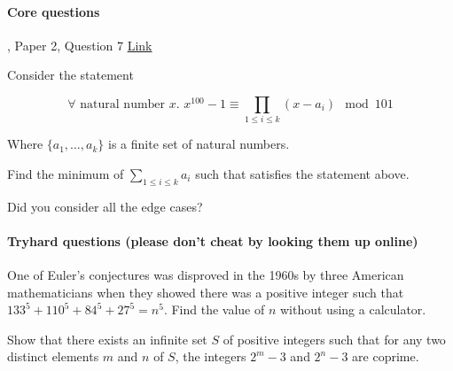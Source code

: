 \documentclass{exam}
\begin{document}
\paragraph{Core questions}
\begin{questions}
, Paper 2, Question 7
\href{http://www.cl.cam.ac.uk/teaching/exams/pastpapers/y2014p2q7.pdf}{Link}

\question Consider the statement

$$\forall \text{ natural number }x \text{. } x^{100} - 1 \equiv \prod_{1 \le i \le k} (x-a_i) \mod 101$$

Where $\{a_1, \ldots , a_k \}$ is a finite set of natural numbers.

Find the minimum of $\sum_{1 \le i \le k} a_i$ such that satisfies the statement above.

Did you consider all the edge cases?



\end{questions}

\paragraph{Tryhard questions (please don't cheat by looking them up online)}
\begin{questions}

\question One of Euler's conjectures was disproved in the 1960s by three American mathematicians when they showed there was a positive integer such that $133^5+110^5+84^5+27^5=n^5$. Find the value of ${n}$ without using a calculator.

\question Show that there exists an infinite set $ S$ of positive integers such that for any two distinct elements $ m$ and $ n$ of $ S$, the integers $ 2^m - 3$ and $ 2^n - 3$ are coprime.

\end{questions}
\end{document}
